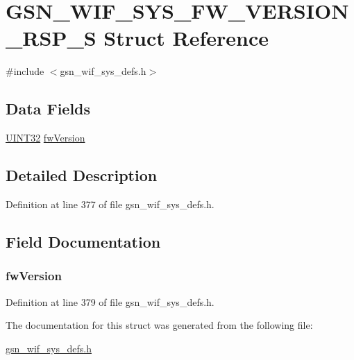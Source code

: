 \hypertarget{a00352}{
\section{GSN\_\-WIF\_\-SYS\_\-FW\_\-VERSION\_\-RSP\_\-S Struct Reference}
\label{a00352}
}


{\ttfamily \#include $<$gsn\_\-wif\_\-sys\_\-defs.h$>$}

\subsection*{Data Fields}
\begin{DoxyCompactItemize}
\item 
\hyperlink{a00660_gae1e6edbbc26d6fbc71a90190d0266018}{UINT32} \hyperlink{a00352_a2b4b060ce8a65ed5b5560c31a87ec90c}{fwVersion}
\end{DoxyCompactItemize}


\subsection{Detailed Description}


Definition at line 377 of file gsn\_\-wif\_\-sys\_\-defs.h.



\subsection{Field Documentation}
\hypertarget{a00352_a2b4b060ce8a65ed5b5560c31a87ec90c}{
\subsubsection[{fwVersion}]{ {\bf fwVersion}}}
\label{a00352_a2b4b060ce8a65ed5b5560c31a87ec90c}


Definition at line 379 of file gsn\_\-wif\_\-sys\_\-defs.h.



The documentation for this struct was generated from the following file:\begin{DoxyCompactItemize}
\item 
\hyperlink{a00612}{gsn\_\-wif\_\-sys\_\-defs.h}\end{DoxyCompactItemize}
